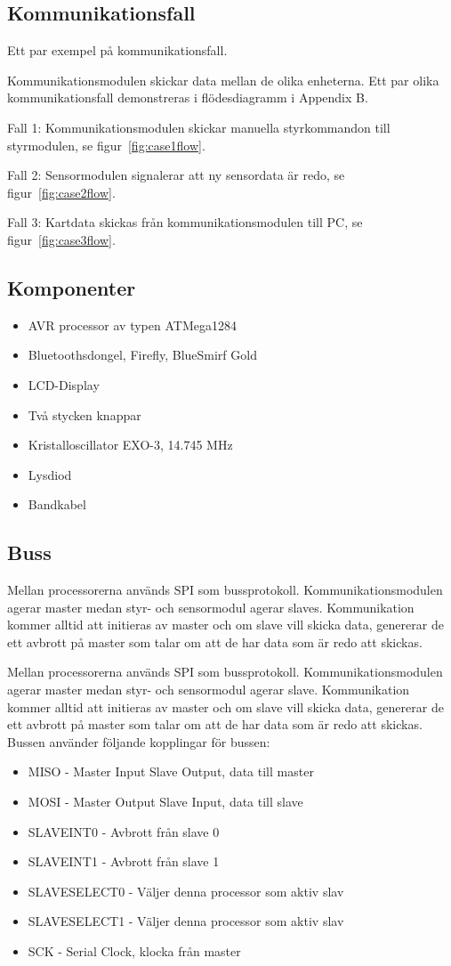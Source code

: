 \documentclass[a4paper,12pt,fleqn]{article}
\begin{document}
\subsection{Kommunikationsfall}
Ett par exempel på kom\-mun\-ikations\-fall.

Kommunikationsmodulen skickar data mellan de olika enheterna. Ett par olika kommunikationsfall demonstreras i flödesdiagramm i Appendix B.

Fall 1: Kommunikationsmodulen skickar manuella styrkommandon till styrmodulen, se figur~\ref{fig:case1flow}.

Fall 2: Sensormodulen signalerar att ny sensordata är redo, se  figur~\ref{fig:case2flow}.

Fall 3: Kartdata skickas från kommunikationsmodulen till PC, se figur~\ref{fig:case3flow}. 
 
\subsection{Komponenter}
\begin{itemize}
  \item AVR processor av typen ATMega1284
  \item Bluetoothsdongel, Firefly, BlueSmirf Gold
  \item LCD-Display
  \item Två stycken knappar
  \item Kristalloscillator EXO-3, 14.745 MHz
  \item Lysdiod
  \item Bandkabel
\end{itemize}

\subsection{Buss}
Mellan processorerna används SPI som bussprotokoll. Kommunikationsmodulen agerar master medan styr- och sensormodul agerar slaves. Kommunikation kommer alltid att initieras av master och om slave vill skicka data, genererar de ett avbrott på master som talar om att de har data som är redo att skickas. 

Mellan processorerna används SPI som bussprotokoll. Kommunikationsmodulen agerar master medan styr- och sensormodul agerar slave. Kommunikation kommer alltid att initieras av master och om slave vill skicka data, genererar de ett avbrott på master som talar om att de har data som är redo att skickas. Bussen använder följande kopplingar för bussen:
\begin{itemize}
	\item MISO - Master Input Slave Output, data till master
	\item MOSI - Master Output Slave Input, data till slave
	\item SLAVEINT0 - Avbrott från slave 0
	\item SLAVEINT1 - Avbrott från slave 1 
	\item SLAVESELECT0 - Väljer denna processor som aktiv slav
	\item SLAVESELECT1 - Väljer denna processor som aktiv slav
	\item SCK - Serial Clock, klocka från master
\end{itemize}
\end{document}
